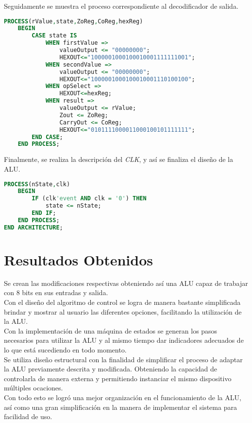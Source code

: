 \documentclass[12pt, letterpaper]{IEEEtran}
\begin{document}
\indent Seguidamente se muestra el proceso correspondiente al decodificador de salida.\\

\begin{lstlisting}[language=VHDL]
	PROCESS(rValue,state,ZoReg,CoReg,hexReg)
	BEGIN
		CASE state IS
			WHEN firstValue =>
				valueOutput <= "00000000";
				HEXOUT<="1000001000100010001111111001";
			WHEN secondValue =>
				valueOutput <= "00000000";
				HEXOUT<="1000001000100010001110100100";
			WHEN opSelect =>
				HEXOUT<=hexReg;
			WHEN result =>
				valueOutput <= rValue;
				Zout <= ZoReg;
				CarryOut <= CoReg;
				HEXOUT<="0101111000011000100101111111";
		END CASE;
	END PROCESS;
\end{lstlisting}

\indent Finalmente, se realiza la descripción del \textit{CLK}, y así se finaliza el diseño de la ALU.

\begin{lstlisting}[language=VHDL]
	PROCESS(nState,clk)
	BEGIN
		IF (clk'event AND clk = '0') THEN 
			state <= nState;
		END IF;
	END PROCESS;
END ARCHITECTURE;
\end{lstlisting}

\section{Resultados Obtenidos}
\indent Se crean las modificaciones respectivas obteniendo así una ALU capaz de trabajar con 8 bits en sus entradas y salida.\\
\indent Con el diseño del algoritmo de control se logra de manera bastante simplificada brindar y mostrar al usuario las diferentes opciones, facilitando la utilización de la ALU.\\
\indent Con la implementación de una máquina de estados se generan los pasos necesarios para utilizar la ALU y al mismo tiempo dar indicadores adecuados de lo que está sucediendo en todo momento.\\
\indent Se utiliza diseño estructural con la finalidad de simplificar el proceso de adaptar la ALU previamente descrita y modificada. Obteniendo la capacidad de controlarla de manera externa y permitiendo instanciar el mismo dispositivo múltiples ocaciones.\\
\indent Con todo esto se logró una mejor organización en el funcionamiento de la ALU, así como una gran simplificación en la manera de implementar el sistema para facilidad de uso.\\
\end{document}
